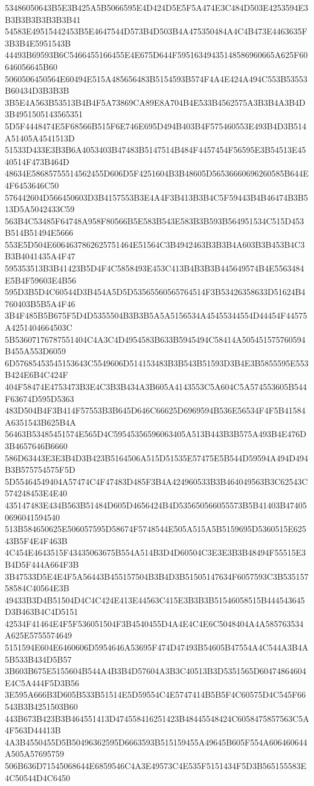 {{{{{{{{{{{{{{{{{{{{{53486050643B5E3B425A5B5066595E4D424D5E5F5A474E3C484D503E4253594E3B3B3B3B3B3B3B41
54583E49515442453B5E4647544D573B4D503B4A475350484A4C4B473E4463635F3B3B4E5951543B
44493B69593B6C5466455166455E4E675D644F59516349435148586960665A625F60646056645B60
5060506450564E60494E515A485656483B5154593B574F4A4E424A494C553B53553B60434D3B3B3B
3B5E4A563B53513B4B4F5A73869CA89E8A704B4E533B4562575A3B3B4A3B4D3B4951505143565351
5D5F4448474E5F68566B515F6E746E695D494B403B4F575460553E493B4D3B514A51405A4541513D
51533D433E3B3B6A4053403B47483B5147514B484F4457454F56595E3B54513E4540514F473B464D
48634E58685755514562455D606D5F4251604B3B48605D56536660696260585B644E4F6453646C50
576442604D566450603D3B4157553B3E4A4F3B413B3B4C5F59443B4B46474B3B513D5A5042433C59
563B4C53485F64748A958F80566B5E583B543E583B3B593B564951534C515D453B514B51494E5666
553E5D504E6064637862625751464E51564C3B4942463B3B3B4A603B3B453B4C3B3B4041435A4F47
595353513B3B41423B5D4F4C5858493E453C413B4B3B3B445649574B4E5563484E5B4F59603E4B56
595D3B5D4C60544D3B454A5D5D53565560565764514F3B53426358633D51624B4760403B5B5A4F46
3B4F485B5B675F5D4D5355504B3B3B5A5A5156534A45455344554D44454F44575A4251404664503C
5B53607176787551404C4A3C4D4954583B633B5945494C58414A505451575760594B455A553D6059
6D57685453545153643C5549606D514153483B3B543B51593D3B4E3B5855595E553B424E6B4C424F
404F58474E4753473B3E4C3B3B434A3B605A4143553C5A604C5A574553605B544F63674D595D5363
483D504B4F3B414F57553B3B645D646C66625D6969594B536E56534F4F5B41584A6351543B625B4A
56463B53485451574E565D4C59545356596063405A513B443B3B575A493B4E476D3B4657646B6660
586D63443E3E3B4D3B423B5164506A515D51535E57475E5B544D59594A494D494B3B575754575F5D
5D55464549404A57474C4F47483D485F3B4A424960533B3B464049563B3C62543C574248453E4E40
435147483E434B563B51484D605D4656424B4D535650566055573B5B41403B474050696041594540
513B584650625E506057595D58674F5748544E505A515A5B5159695D5360515E62543B5F4E4F463B
4C454E4643515F43435063675B554A514B3D4D60504C3E3E3B3B48494F55515E3B4D5F444A664F3B
3B47533D5E4E4F5A56443B455157504B3B4D3B51505147634F6057593C3B53515758584C40564E3B
49433B3D4B51504D4C4C424E413E44563C415E3B3B3B51546058515B444543645D3B463B4C4D5151
42534F41464E4F5F536051504F3B4540455D4A4E4C4E6C5048404A4A585763534A625E5755574649
5151594E604E6460606D5954646A53695F474D47493B54605B47554A4C544A3B4A5B533B434D5B57
3B603B675E5155604B544A4B3B4D57604A3B3C40513B3D5351565D60474864604E4C5A444F5D3B56
3E595A666B3D605B533B51514E5D59554C4E5747414B5B5F4C60575D4C545F66543B3B4251503B60
443B673B423B3B464551413D474558416251423B48445548424C6058475857563C5A4F563D44413B
4A3B4550455D5B50496362595D6663593B515159455A49645B605F554A606460644A505A57695759
506B636D71545068644E6859546C4A3E49573C4E535F5151434F5D3B565155583E4C50544D4C6450
}}}}}}}}}}}}}}}}}}}}}
